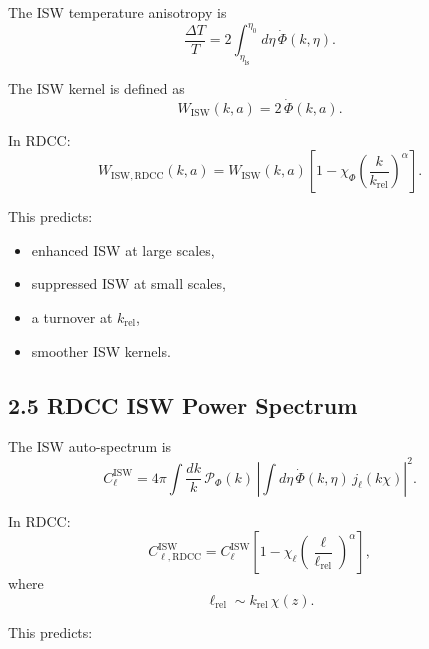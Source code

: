 \documentclass[11pt,a4paper]{article}
\begin{document}
The ISW temperature anisotropy is
\begin{equation}
    \frac{\Delta T}{T}
    = 2 \int_{\eta_{\mathrm{ls}}}^{\eta_{0}} d\eta\,
      \dot{\Phi}(k,\eta).
\end{equation}

The ISW kernel is defined as
\begin{equation}
    W_{\mathrm{ISW}}(k,a)
    = 2\,\dot{\Phi}(k,a).
\end{equation}

In RDCC:
\begin{equation}
    W_{\mathrm{ISW,RDCC}}(k,a)
    = W_{\mathrm{ISW}}(k,a)
      \left[
        1 - \chi_{\Phi}
        \left(\frac{k}{k_{\mathrm{rel}}}\right)^{\alpha}
      \right].
\end{equation}

This predicts:

\begin{itemize}
    \item enhanced ISW at large scales,
    \item suppressed ISW at small scales,
    \item a turnover at $k_{\mathrm{rel}}$,
    \item smoother ISW kernels.
\end{itemize}

\subsection*{2.5 RDCC ISW Power Spectrum}

The ISW auto-spectrum is
\begin{equation}
    C_{\ell}^{\mathrm{ISW}}
    = 4\pi \int \frac{dk}{k}\,
      \mathcal{P}_{\Phi}(k)\,
      \left|
        \int d\eta\,
        \dot{\Phi}(k,\eta)\,
        j_{\ell}(k\chi)
      \right|^{2}.
\end{equation}

In RDCC:
\begin{equation}
    C_{\ell,\mathrm{RDCC}}^{\mathrm{ISW}}
    = C_{\ell}^{\mathrm{ISW}}
      \left[
        1 - \chi_{\ell}
        \left(\frac{\ell}{\ell_{\mathrm{rel}}}\right)^{\alpha}
      \right],
\end{equation}
where
\begin{equation}
    \ell_{\mathrm{rel}}
    \sim k_{\mathrm{rel}}\,\chi(z).
\end{equation}

This predicts:
\end{document}
